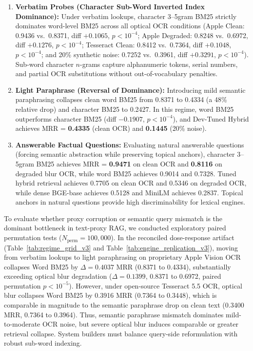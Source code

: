 \documentclass[conference]{IEEEtran}
\begin{document}
\begin{enumerate}
    \setlength{\itemsep}{0.2pt plus 0.1pt}
    \setlength{\parskip}{0pt}
    \item \textbf{Verbatim Probes (Character Sub-Word Inverted Index Dominance):} Under verbatim lookups, character 3--5gram BM25 strictly dominates word-level BM25 across all optical OCR conditions (Apple Clean: 0.9436 vs.\ 0.8371, diff $+0.1065$, $p < 10^{-4}$; Apple Degraded: 0.8248 vs.\ 0.6972, diff $+0.1276$, $p < 10^{-4}$; Tesseract Clean: 0.8412 vs.\ 0.7364, diff $+0.1048$, $p < 10^{-4}$; and 20\% synthetic noise: 0.7252 vs.\ 0.3961, diff $+0.3291$, $p < 10^{-4}$). Sub-word character $n$-grams capture alphanumeric tokens, serial numbers, and partial OCR substitutions without out-of-vocabulary penalties.
    \item \textbf{Light Paraphrase (Reversal of Dominance):} Introducing mild semantic paraphrasing collapses clean word BM25 from 0.8371 to 0.4334 (a 48\% relative drop) and character BM25 to 0.2427. In this regime, word BM25 outperforms character BM25 (diff $-0.1907$, $p < 10^{-4}$), and Dev-Tuned Hybrid achieves MRR = \textbf{0.4335} (clean OCR) and \textbf{0.1445} (20\% noise).
    \item \textbf{Answerable Factual Questions:} Evaluating natural answerable questions (forcing semantic abstraction while preserving topical anchors), character 3--5gram BM25 achieves MRR = \textbf{0.9471} on clean OCR and \textbf{0.8116} on degraded blur OCR, while word BM25 achieves 0.9014 and 0.7328. Tuned hybrid retrieval achieves 0.7705 on clean OCR and 0.5346 on degraded OCR, while dense BGE-base achieves 0.5128 and MiniLM achieves 0.2837. Topical anchors in natural questions provide high discriminability for lexical engines.
\end{enumerate}

To evaluate whether proxy corruption or semantic query mismatch is the dominant bottleneck in text-proxy RAG, we conducted exploratory paired permutation tests ($N_{\text{perm}}=100{,}000$). In the reconciled dose-response artifact (Table~\ref{tab:regime_grid_v3} and Table~\ref{tab:engine_replication_v3}), moving from verbatim lookups to light paraphrasing on proprietary Apple Vision OCR collapses Word BM25 by $\Delta = 0.4037$ MRR (0.8371 to 0.4334), substantially exceeding optical blur degradation ($\Delta = 0.1399$, 0.8371 to 0.6972, paired permutation $p < 10^{-5}$). However, under open-source Tesseract 5.5 OCR, optical blur collapses Word BM25 by 0.3916 MRR (0.7364 to 0.3448), which is comparable in magnitude to the semantic paraphrase drop on clean text (0.3400 MRR, 0.7364 to 0.3964). Thus, semantic paraphrase mismatch dominates mild-to-moderate OCR noise, but severe optical blur induces comparable or greater retrieval collapse. System builders must balance query-side reformulation with robust sub-word indexing.
\end{document}
